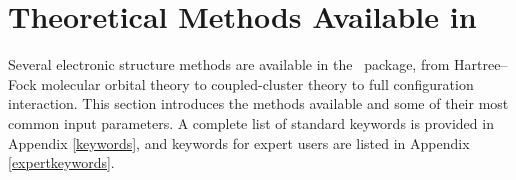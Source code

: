 \section{Theoretical Methods Available in \PSIfour}

Several electronic structure methods are available in the \PSIfour\
package, from Hartree--Fock molecular orbital theory to coupled-cluster
theory to full configuration interaction.  This section introduces
the methods available and some of their most common input parameters.
A complete list of standard keywords is provided in Appendix
\ref{keywords}, and keywords for expert users are listed in Appendix
\ref{expertkeywords}.
 

